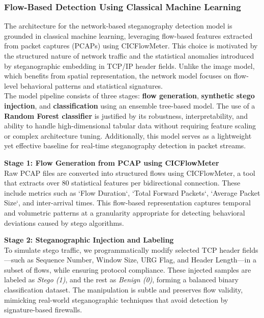 \documentclass[12pt]{article}
\begin{document}
\subsubsection{Flow-Based Detection Using Classical Machine Learning}

\indent The architecture for the network-based steganography detection model is grounded in classical machine learning, leveraging flow-based features extracted from packet captures (PCAPs) using CICFlowMeter. This choice is motivated by the structured nature of network traffic and the statistical anomalies introduced by steganographic embedding in TCP/IP header fields. Unlike the image model, which benefits from spatial representation, the network model focuses on flow-level behavioral patterns and statistical signatures. \vspace{0.3cm} \\

The model pipeline consists of three stages: \textbf{flow generation}, \textbf{synthetic stego injection}, and \textbf{classification} using an ensemble tree-based model. The use of a \textbf{Random Forest classifier} is justified by its robustness, interpretability, and ability to handle high-dimensional tabular data without requiring feature scaling or complex architecture tuning. Additionally, this model serves as a lightweight yet effective baseline for real-time steganography detection in packet streams.

\vspace{0.3cm}

\textbf{Stage 1: Flow Generation from PCAP using CICFlowMeter}\\
Raw PCAP files are converted into structured flows using CICFlowMeter, a tool that extracts over 80 statistical features per bidirectional connection. These include metrics such as `Flow Duration`, `Total Forward Packets`, `Average Packet Size`, and inter-arrival times. This flow-based representation captures temporal and volumetric patterns at a granularity appropriate for detecting behavioral deviations caused by stego algorithms.

\vspace{0.2cm}

\textbf{Stage 2: Steganographic Injection and Labeling}\\
To simulate stego traffic, we programmatically modify selected TCP header fields—such as Sequence Number, Window Size, URG Flag, and Header Length—in a subset of flows, while ensuring protocol compliance. These injected samples are labeled as \textit{Stego (1)}, and the rest as \textit{Benign (0)}, forming a balanced binary classification dataset. The manipulation is subtle and preserves flow validity, mimicking real-world steganographic techniques that avoid detection by signature-based firewalls.
\end{document}
